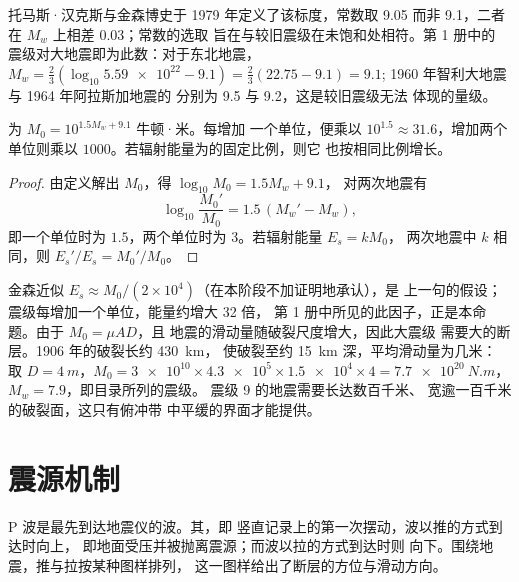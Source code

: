 托马斯·汉克斯与金森博史于 1979 年定义了该标度，常数取
9.05 而非 9.1，二者在 $M_w$ 上相差 0.03；常数的选取
旨在与较旧震级在未饱和处相符。第 1 册中的
震级对大地震即为此数：对于东北地震，
$M_w = \tfrac23(\log_{10}\num{5.59e22} - 9.1) = \tfrac23(22.75 - 9.1) = 9.1$;
1960 年智利大地震与 1964 年阿拉斯加地震的
分别为 9.5 与 9.2，这是较旧震级无法
体现的量级。

\begin{proposition}[震级的一个单位]\label{prop:b1:earthquake-source:moment-steps}
为 $M_0 = 10^{1.5 M_w + 9.1}$ 牛顿·米。每增加
一个单位，便乘以 $10^{1.5} \approx 31.6$，增加两个单位则乘以
$1000$。若辐射能量为的固定比例，则它
也按相同比例增长。
\end{proposition}

\begin{proof}
由定义解出 $M_0$，得 $\log_{10} M_0 = 1.5 M_w + 9.1$，
对两次地震有
\[
  \log_{10}\frac{M_0'}{M_0} = 1.5\,(M_w' - M_w) ,
\]
即一个单位时为 $1.5$，两个单位时为 $3$。若辐射能量 $E_s = k M_0$，
两次地震中 $k$ 相同，则 $E_s'/E_s = M_0'/M_0$。
\end{proof}

金森近似 $E_s \approx M_0/(2\times10^4)$（在本阶段不加证明地承认），是
上一句的假设；震级每增加一个单位，能量约增大 32 倍，
第 1 册中所见的此因子，正是本命题。由于 $M_0 = \mu A D$，且
地震的滑动量随破裂尺度增大，因此大震级
需要大的断层。1906 年的破裂长约 \qty{430}{km}，
使破裂至约 \qty{15}{km} 深，平均滑动量为几米：
取 $D = \qty{4}{m}$，$M_0 = \num{3e10}\times\num{4.3e5}\times\num{1.5e4}
\times 4 = \qty{7.7e20}{N.m}$，$M_w = 7.9$，即目录所列的震级。
震级 9 的地震需要长达数百千米、
宽逾一百千米的破裂面，这只有俯冲带
中平缓的界面才能提供。

\section{震源机制}\label{sec:b1:earthquake-source:focal}

P 波是最先到达地震仪的波。其，即
竖直记录上的第一次摆动，波以推的方式到达时向上，
即地面受压并被抛离震源；而波以拉的方式到达时则
向下。围绕地震，推与拉按某种图样排列，
这一图样给出了断层的方位与滑动方向。

